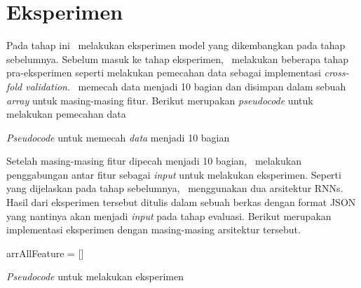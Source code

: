 \section{Eksperimen}
Pada tahap ini \saya~melakukan eksperimen model yang dikembangkan pada tahap sebelumnya. Sebelum masuk ke tahap eksperimen, \saya~melakukan beberapa tahap pra-eksperimen seperti melakukan pemecahan data sebagai implementasi \textit{cross-fold validation}. \Saya~memecah data menjadi 10 bagian dan disimpan dalam sebuah \textit{array} untuk masing-masing fitur. Berikut merupakan \textit{pseudocode} untuk melakukan pemecahan data

\begin{kode}

	
	
	\caption{\textit{Pseudocode} untuk memecah \textit{data} menjadi 10 bagian}	
	\label{code:split}
\end{kode}

Setelah masing-masing fitur dipecah menjadi 10 bagian, \saya~melakukan penggabungan antar fitur sebagai \textit{input} untuk melakukan eksperimen. Seperti yang dijelaskan pada tahap sebelumnya, \saya~menggunakan dua arsitektur RNNs. Hasil dari eksperimen tersebut ditulis dalam sebuah berkas dengan format JSON yang nantinya akan menjadi \textit{input} pada tahap evaluasi. Berikut merupakan implementasi eksperimen dengan masing-masing arsitektur tersebut.

\begin{kode}
	
	
	arrAllFeature = []\;
	\BlankLine
	
	\caption{\textit{Pseudocode} untuk melakukan eksperimen}
	\label{code:eksperimen}	
\end{kode}


